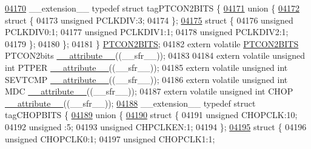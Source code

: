 \begin{DoxyCode}
\hypertarget{a00015_source_l04170}{}\hyperlink{a00014}{04170} \_\_extension\_\_ \textcolor{keyword}{typedef} \textcolor{keyword}{struct }tagPTCON2BITS \{
\hypertarget{a00015_source_l04171}{}\hyperlink{a00015}{04171}   \textcolor{keyword}{union }\{
\hypertarget{a00015_source_l04172}{}\hyperlink{a00015}{04172}     \textcolor{keyword}{struct }\{
04173       \textcolor{keywordtype}{unsigned} PCLKDIV:3;
04174     \};
\hypertarget{a00015_source_l04175}{}\hyperlink{a00015}{04175}     \textcolor{keyword}{struct }\{
04176       \textcolor{keywordtype}{unsigned} PCLKDIV0:1;
04177       \textcolor{keywordtype}{unsigned} PCLKDIV1:1;
04178       \textcolor{keywordtype}{unsigned} PCLKDIV2:1;
04179     \};
04180   \};
04181 \} \hyperlink{a00014_d9/db8/a00658}{PTCON2BITS};
04182 \textcolor{keyword}{extern} \textcolor{keyword}{volatile} \hyperlink{a00014_d9/db8/a00658}{PTCON2BITS} PTCON2bits \hyperlink{a00015_a493c46f03454991ccc5aa7a6e1dfb2a7}{\_\_attribute\_\_}((\_\_sfr\_\_));
04183 
04184 \textcolor{keyword}{extern} \textcolor{keyword}{volatile} \textcolor{keywordtype}{unsigned} \textcolor{keywordtype}{int}  PTPER \hyperlink{a00015_a493c46f03454991ccc5aa7a6e1dfb2a7}{\_\_attribute\_\_}((\_\_sfr\_\_));
04185 \textcolor{keyword}{extern} \textcolor{keyword}{volatile} \textcolor{keywordtype}{unsigned} \textcolor{keywordtype}{int}  SEVTCMP \hyperlink{a00015_a493c46f03454991ccc5aa7a6e1dfb2a7}{\_\_attribute\_\_}((\_\_sfr\_\_));
04186 \textcolor{keyword}{extern} \textcolor{keyword}{volatile} \textcolor{keywordtype}{unsigned} \textcolor{keywordtype}{int}  MDC \hyperlink{a00015_a493c46f03454991ccc5aa7a6e1dfb2a7}{\_\_attribute\_\_}((\_\_sfr\_\_));
04187 \textcolor{keyword}{extern} \textcolor{keyword}{volatile} \textcolor{keywordtype}{unsigned} \textcolor{keywordtype}{int}  CHOP \hyperlink{a00015_a493c46f03454991ccc5aa7a6e1dfb2a7}{\_\_attribute\_\_}((\_\_sfr\_\_));
\hypertarget{a00015_source_l04188}{}\hyperlink{a00014}{04188} \_\_extension\_\_ \textcolor{keyword}{typedef} \textcolor{keyword}{struct }tagCHOPBITS \{
\hypertarget{a00015_source_l04189}{}\hyperlink{a00015}{04189}   \textcolor{keyword}{union }\{
\hypertarget{a00015_source_l04190}{}\hyperlink{a00015}{04190}     \textcolor{keyword}{struct }\{
04191       \textcolor{keywordtype}{unsigned} CHOPCLK:10;
04192       \textcolor{keywordtype}{unsigned} :5;
04193       \textcolor{keywordtype}{unsigned} CHPCLKEN:1;
04194     \};
\hypertarget{a00015_source_l04195}{}\hyperlink{a00015}{04195}     \textcolor{keyword}{struct }\{
04196       \textcolor{keywordtype}{unsigned} CHOPCLK0:1;
04197       \textcolor{keywordtype}{unsigned} CHOPCLK1:1;

\end{DoxyCode}
